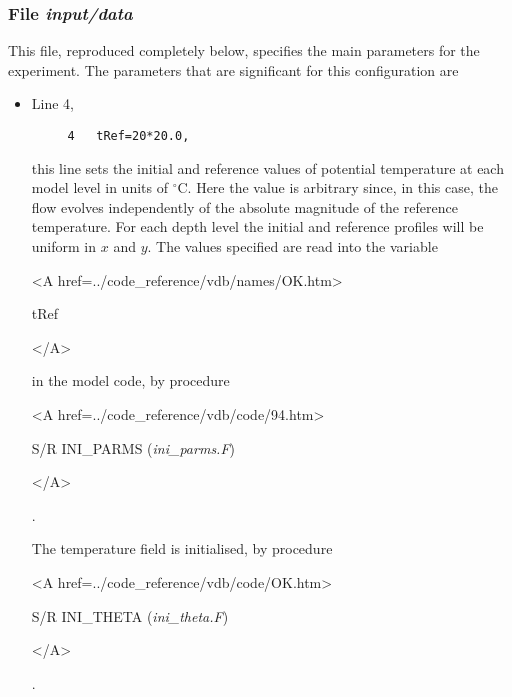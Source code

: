 \subsubsection{File {\it input/data}}
\label{www:tutorials}

This file, reproduced completely below, specifies the main parameters 
for the experiment. The parameters that are significant for this configuration
are

\begin{itemize}

\item Line 4, 
\begin{verbatim}
     4   tRef=20*20.0,
\end{verbatim}
this line sets
the initial and reference values of potential temperature at each model
level in units of $^{\circ}\mathrm{C}$. Here the value is arbitrary since, in this case, the 
flow evolves independently of the absolute magnitude of the reference temperature.
For each depth level the initial and reference profiles will be uniform in
$x$ and $y$. The values specified are read into the
variable 
{\bf 
\begin{rawhtml} <A href=../code_reference/vdb/names/OK.htm> \end{rawhtml}
tRef
\begin{rawhtml} </A>\end{rawhtml}
} 
in the model code, by procedure 
{\it
\begin{rawhtml} <A href=../code_reference/vdb/code/94.htm> \end{rawhtml}
S/R INI\_PARMS ({\it ini\_parms.F})
\begin{rawhtml} </A>\end{rawhtml}.
}
The temperature field is initialised, by procedure 
{\it
\begin{rawhtml} <A href=../code_reference/vdb/code/OK.htm> \end{rawhtml}
S/R INI\_THETA ({\it ini\_theta.F})
\begin{rawhtml} </A>\end{rawhtml}.
}



\end{itemize}
